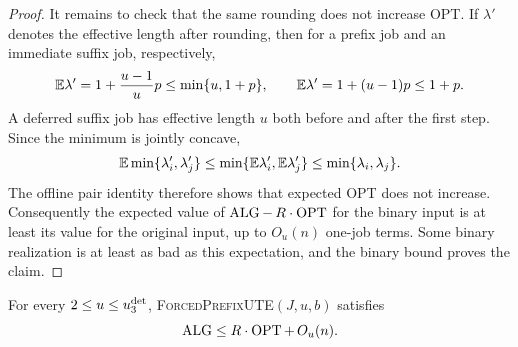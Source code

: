 \begin{proof}
It remains to check that the same rounding does not increase OPT.  If
$\lambda'$ denotes the effective length after rounding, then for a prefix job
and an immediate suffix job, respectively,
\begin{equation}
 \mathbb{E}\lambda'=1+\frac{u-1}{u}p\le \min\{u,1+p\},
 \qquad
 \mathbb{E}\lambda'=1+(u-1)p\le1+p.
\end{equation}
A deferred suffix job has effective length $u$ both before and after the
first step.  Since the minimum is jointly concave,
\[
 \mathbb{E}\min\{\lambda_i',\lambda_j'\}
 \le \min\{\mathbb{E}\lambda_i',\mathbb{E}\lambda_j'\}
 \le \min\{\lambda_i,\lambda_j\}.
\]
The offline pair identity therefore shows that expected OPT does not
increase.  Consequently the expected value of
$\operatorname{ALG}-\,R\cdot\operatorname{OPT}$ for the binary input is at least its value for the original
input, up to $O_u(n)$ one-job terms.  Some binary realization is at least as
bad as this expectation, and the binary bound proves the claim.
\end{proof}

\begin{claim}
\label{clm:opt:ute-high-range}
For every $2\le u\le u_{3}^{\mathrm{det}}$,
\textnormal{\textsc{ForcedPrefixUTE}}$(J,u,b)$ satisfies
\[
 \operatorname{ALG}\le R\cdot\operatorname{OPT}+\,O_u(n).
\]
\end{claim}

